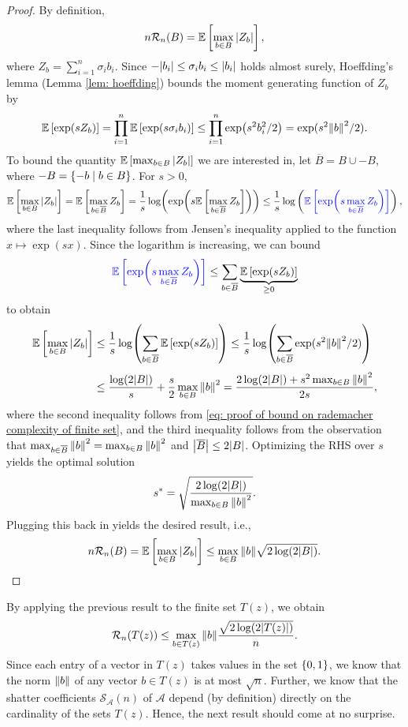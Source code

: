 \begin{proof}
By definition,
\[
    n \mathcal{R}_n(B) = \mathbb{E}\left[ \max_{b \in B} \abs{Z_b} \right],
\]
where $Z_b = \sum_{i=1}^n \sigma_i b_i$. Since $-\abs{b_i} \leq \sigma_i b_i \leq \abs{b_i}$ holds almost surely, Hoeffding's lemma (Lemma \ref{lem: hoeffding}) bounds the moment generating function of $Z_b$ by
\begin{equation}
\label{eq: proof of bound on rademacher complexity of finite set}
    \mathbb{E}\left[\exp(s Z_b)\right] = \prod_{i=1}^n \mathbb{E}\left[\exp(s \sigma_i b_i)\right] \leq \prod_{i=1}^n \exp(s^2 b_i^2 / 2) = \mathrm{exp}(s^2 \norm{b}^2 / 2).
\end{equation}
To bound the quantity $\mathbb{E}\left[\max_{b \in B} \abs{Z_b}\right]$ we are interested in, let $\overline{B} = B \cup -B$, where $-B = \left\{-b \mathrel{|} b \in B\right\}$. For $s>0$,
\[
    \mathbb{E}\left[\max_{b \in B} \abs{Z_b}\right] = \mathbb{E}\left[\max_{b \in \overline{B}} Z_b\right] = \frac{1}{s} \log( \exp( s \mathbb{E}\left[\max_{b \in \overline{B}} Z_b\right] )) \leq \frac{1}{s} \log \left( {\color{blue} \mathbb{E}\left[\exp( s \max_{b \in \overline{B}} Z_b )\right]} \right),
\]
where the last inequality follows from Jensen's inequality applied to the function $x \mapsto \exp(sx)$. Since the logarithm is increasing, we can bound
\[
    {\color{blue} \mathbb{E}\left[ \exp( s \max_{b \in \overline{B}} Z_b )\right] } \leq \sum_{b \in \overline{B}} \underbrace{\mathbb{E}\left[\exp(s Z_b)\right]}_{\geq 0}
\]
to obtain
\begin{align*}
    \mathbb{E}\left[\max_{b \in B} \abs{Z_b}\right] &\leq \frac{1}{s} \log( \sum_{b \in \overline{B}} \mathbb{E}\left[\exp(s Z_b)\right] ) \leq \frac{1}{s} \log( \sum_{b \in \overline{B}} \mathrm{exp}(s^2 \norm{b}^2 / 2) ) \\[4pt]
        &\leq \frac{\log(2 \abs{B})}{s} + \frac{s}{2} \max_{b \in B} \norm{b}^2 = \frac{2 \log(2 \abs{B}) + s^2 \max_{b \in B} \norm{b}^2}{2s},
\end{align*}
where the second inequality follows from \eqref{eq: proof of bound on rademacher complexity of finite set}, and the third inequality follows from the observation that $\max_{b \in \overline{B}} \norm{b}^2 = \max_{b \in B} \norm{b}^2$ and $\abs{\overline{B}} \leq 2 \abs{B}$. Optimizing the RHS over $s$ yields the optimal solution
\[
    s^* = \sqrt{\frac{2 \log(2 \abs{B})}{\max_{b \in B} \norm{b}^2}}.
\]
Plugging this back in yields the desired result, i.e.,
\[
    n \mathcal{R}_n(B) = \mathbb{E}\left[ \max_{b \in B} \abs{Z_b} \right] \leq \max_{b \in B} \norm{b} \sqrt{2 \log(2 \abs{B})}.
\]
\end{proof}

By applying the previous result to the finite set $T(z)$, we obtain
\[
    \mathcal{R}_n(T(z)) \leq \max_{b \in T(z)} \norm{b} \frac{\sqrt{2 \log(2 \abs{T(z)})}}{n}.
\]
Since each entry of a vector in $T(z)$ takes values in the set $\left\{0, 1\right\}$, we know that the norm $\norm{b}$ of any vector $b \in T(z)$ is at most $\sqrt{n}$. Further, we know that the shatter coefficients $\mathcal{S}_{\mathcal{A}}(n)$ of $\mathcal{A}$ depend (by definition) directly on the cardinality of the sets $T(z)$. Hence, the next result should come at no surprise.

